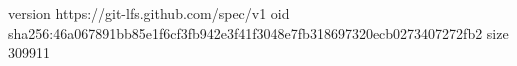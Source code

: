 version https://git-lfs.github.com/spec/v1
oid sha256:46a067891bb85e1f6cf3fb942e3f41f3048e7fb318697320ecb0273407272fb2
size 309911
